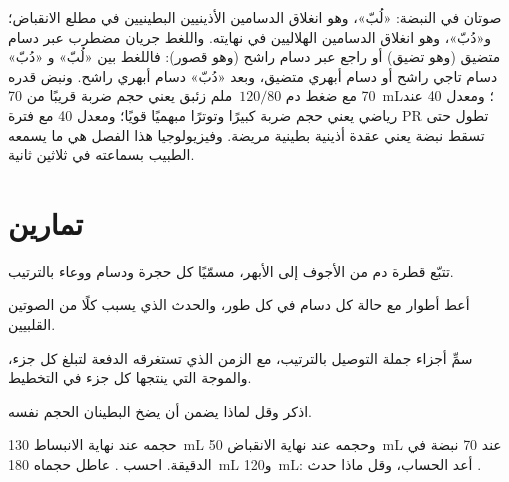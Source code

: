 \begin{example}\label{ex:b2:heart:reading}
صوتان في النبضة: «لُبّ»، وهو انغلاق الدسامين الأذينيين البطينيين في مطلع
الانقباض؛ و«دُبّ»، وهو انغلاق الدسامين الهلاليين في نهايته. واللغط
جريان مضطرب عبر دسام متضيق (وهو تضيق) أو راجع
عبر دسام راشح (وهو قصور): فاللغط بين «لُبّ» و
«دُبّ» دسام تاجي راشح أو دسام أبهري متضيق، وبعد «دُبّ»
دسام أبهري راشح. ونبض قدره 70 مع ضغط دم
$120/80$~ملم زئبق يعني حجم ضربة قريبًا من \qty{70}{mL}؛
ومعدل 40 عند رياضي يعني حجم ضربة كبيرًا وتوترًا
مبهميًا قويًا؛ ومعدل 40 مع فترة PR تطول حتى تسقط
نبضة يعني عقدة أذينية بطينية مريضة. وفيزيولوجيا هذا الفصل هي
ما يسمعه الطبيب بسماعته في ثلاثين ثانية.
\end{example}

\section{تمارين}

\begin{exercise}[$\star$]\label{exo:b2:heart:1}
تتبّع قطرة دم من الأجوف إلى الأبهر، مسمّيًا كل
حجرة ودسام ووعاء بالترتيب.
\end{exercise}

\begin{exercise}[$\star$]\label{exo:b2:heart:2}
أعط أطوار  مع حالة كل دسام
في كل طور، والحدث الذي يسبب كلًا من الصوتين
القلبيين.
\end{exercise}

\begin{exercise}[$\star$]\label{exo:b2:heart:3}
سمِّ أجزاء جملة التوصيل بالترتيب، مع الزمن الذي تستغرقه
الدفعة لتبلغ كل جزء، والموجة التي ينتجها كل جزء في التخطيط.
\end{exercise}

\begin{exercise}[$\star$]\label{exo:b2:heart:4}
اذكر  وقل لماذا يضمن أن يضخ
البطينان الحجم نفسه.
\end{exercise}

\begin{exercise}[$\star\star$]\label{exo:b2:heart:5}
 حجمه عند نهاية الانبساط \qty{130}{mL} وحجمه عند
نهاية الانقباض \qty{50}{mL} عند 70 نبضة في الدقيقة. احسب
  . 
عاطل حجماه \qty{180}{mL} و\qty{120}{mL}: أعد الحساب، وقل
ماذا حدث .
\end{exercise}

